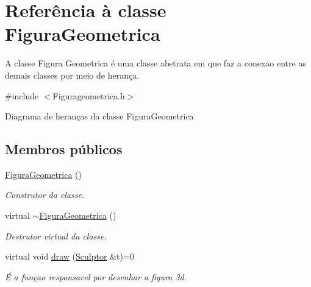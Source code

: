\hypertarget{class_figura_geometrica}{}\section{Referência à classe Figura\+Geometrica}
\label{class_figura_geometrica}


A classe Figura Geometrica é uma classe abstrata em que faz a conexao entre as demais classes por meio de herança.  




{\ttfamily \#include $<$Figurageometrica.\+h$>$}



Diagrama de heranças da classe Figura\+Geometrica
\subsection*{Membros públicos}
\begin{DoxyCompactItemize}
\item 
\hyperlink{class_figura_geometrica_a81d7c7efaea511e60a15f5a363138dd9}{Figura\+Geometrica} ()
\begin{DoxyCompactList}\small\item\em Construtor da classe. \end{DoxyCompactList}\item 
virtual \hyperlink{class_figura_geometrica_a40ce7fb4b6cbf0cbe3852e342c739988}{$\sim$\+Figura\+Geometrica} ()
\begin{DoxyCompactList}\small\item\em Destrutor virtual da classe. \end{DoxyCompactList}\item 
virtual void \hyperlink{class_figura_geometrica_a34585fd7c0bd7378fc69c4ee208e676c}{draw} (\hyperlink{class_sculptor}{Sculptor} \&t)=0
\begin{DoxyCompactList}\small\item\em É a funçao responsavel por desenhar a figura 3d. \end{DoxyCompactList}\end{DoxyCompactItemize}
